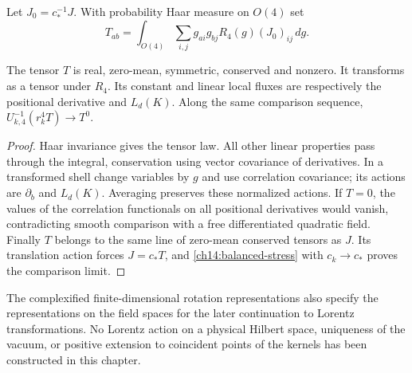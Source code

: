 Let $J_0=c_*^{-1}J$. With probability Haar measure on $O(4)$ set
\begin{equation}\label{ch14:averaged-stress}
 T_{ab}=\int_{O(4)}\sum_{i,j}g_{ai}g_{bj}R_4(g)(J_0)_{ij}\,dg.
\end{equation}
\begin{proposition}
\label{ch14:normalized-stress}
The tensor $T$ is real, zero-mean, symmetric, conserved and nonzero.
It transforms as a tensor under $R_4$. Its constant and linear local
fluxes are respectively the positional derivative and $L_d(K)$.
Along the same comparison sequence,
$U_{k,4}^{-1}(r_k^4T)\to T^0$.
\end{proposition}

\begin{proof}
Haar invariance gives the tensor law. All other linear properties
pass through the integral, conservation using vector covariance of
derivatives. In a transformed shell change variables by $g$ and use
correlation covariance; its actions are $\partial_b$ and $L_d(K)$.
Averaging preserves these normalized actions. If $T=0$, the values of the correlation functionals on all
positional derivatives would vanish, contradicting smooth comparison
with a free differentiated quadratic field. Finally $T$ belongs to
the same line of zero-mean conserved tensors as $J$. Its translation action
forces $J=c_*T$, and \eqref{ch14:balanced-stress} with
$c_k\to c_*$ proves the comparison limit.
\end{proof}

The complexified finite-dimensional rotation representations also
specify the representations on the field spaces for the later continuation to
Lorentz transformations. No Lorentz action on a physical Hilbert
space, uniqueness of the vacuum, or positive extension to coincident points of the
kernels has been constructed in this chapter.
